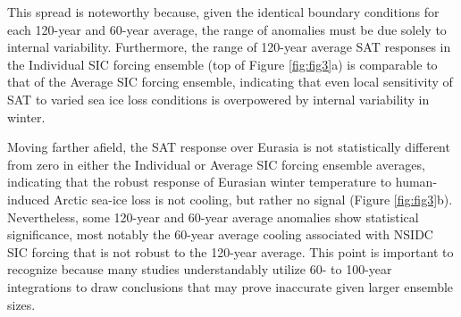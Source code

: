 \documentclass{nature}
\begin{document}
This spread is noteworthy because, given the identical boundary conditions for each 120-year and 60-year average, the range of anomalies must be due solely to internal variability. Furthermore, the range of 120-year average SAT responses in the Individual SIC forcing ensemble (top of Figure \ref{fig:fig3}a) is comparable to that of the Average SIC forcing ensemble, indicating that even local sensitivity of SAT to varied sea ice loss conditions is overpowered by internal variability in winter.    %


Moving farther afield, the SAT response over Eurasia is not statistically different from zero in either the Individual or Average SIC forcing ensemble averages, indicating that the robust response of Eurasian winter temperature to human-induced Arctic sea-ice loss is not cooling, but rather no signal (Figure \ref{fig:fig3}b). Nevertheless, some 120-year and 60-year average anomalies show statistical significance, most notably the 60-year average cooling associated with NSIDC SIC forcing that is not robust to the 120-year average. This point is important to recognize because many studies understandably utilize 60- to 100-year integrations to draw conclusions that may prove inaccurate given larger ensemble sizes.%
\end{document}
